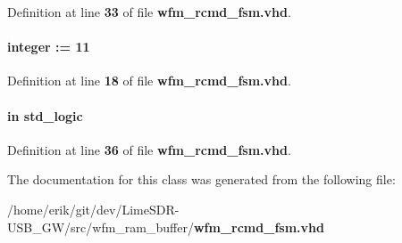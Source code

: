 Definition at line {\bf 33} of file {\bf wfm\+\_\+rcmd\+\_\+fsm.\+vhd}.

\paragraph[{wfm\+\_\+outfifo\+\_\+size}]{ {\bfseries \textcolor{vhdlchar}{ }} {\bfseries \textcolor{comment}{integer}\textcolor{vhdlchar}{ }\textcolor{vhdlchar}{ }\textcolor{vhdlchar}{\+:}\textcolor{vhdlchar}{=}\textcolor{vhdlchar}{ }\textcolor{vhdlchar}{ } \textcolor{vhdldigit}{11} \textcolor{vhdlchar}{ }} \hspace{0.3cm}{\ttfamily [Generic]}}\label{classwfm__rcmd__fsm_a34c7f4f72360546393d9261a065de65a}


Definition at line {\bf 18} of file {\bf wfm\+\_\+rcmd\+\_\+fsm.\+vhd}.

\paragraph[{wfm\+\_\+play\+\_\+stop}]{ {\bfseries \textcolor{keywordflow}{in}\textcolor{vhdlchar}{ }} {\bfseries \textcolor{comment}{std\+\_\+logic}\textcolor{vhdlchar}{ }} \hspace{0.3cm}{\ttfamily [Port]}}\label{classwfm__rcmd__fsm_aec820bcf21fff0d393f59c1e0478385c}


Definition at line {\bf 36} of file {\bf wfm\+\_\+rcmd\+\_\+fsm.\+vhd}.



The documentation for this class was generated from the following file\+:\begin{DoxyCompactItemize}
\item 
/home/erik/git/dev/\+Lime\+S\+D\+R-\/\+U\+S\+B\+\_\+\+G\+W/src/wfm\+\_\+ram\+\_\+buffer/{\bf wfm\+\_\+rcmd\+\_\+fsm.\+vhd}\end{DoxyCompactItemize}
